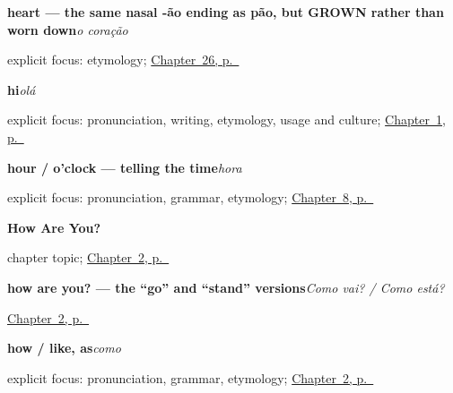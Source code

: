 \noindent\begin{minipage}[t]{\linewidth}
\raggedright
\textbf{heart — the same nasal -ão ending as pão, but GROWN rather than worn down}\enspace\emph{o coração}\par
\footnotesize explicit focus: etymology; \hyperref[ch:pt-body-how-are-you]{Chapter~26, p.~\pageref*{ch:pt-body-how-are-you}}
\end{minipage}\par\smallskip

\noindent\begin{minipage}[t]{\linewidth}
\raggedright
\textbf{hi}\enspace\emph{olá}\par
\footnotesize explicit focus: pronunciation, writing, etymology, usage and culture; \hyperref[ch:greetings]{Chapter~1, p.~\pageref*{ch:greetings}}
\end{minipage}\par\smallskip

\noindent\begin{minipage}[t]{\linewidth}
\raggedright
\textbf{hour / o'clock — telling the time}\enspace\emph{hora}\par
\footnotesize explicit focus: pronunciation, grammar, etymology; \hyperref[ch:pt-telling-time]{Chapter~8, p.~\pageref*{ch:pt-telling-time}}
\end{minipage}\par\smallskip

\noindent\begin{minipage}[t]{\linewidth}
\raggedright
\textbf{How Are You?}\par
\footnotesize chapter topic; \hyperref[ch:pt-how-are-you]{Chapter~2, p.~\pageref*{ch:pt-how-are-you}}
\end{minipage}\par\smallskip

\noindent\begin{minipage}[t]{\linewidth}
\raggedright
\textbf{how are you? — the “go” and “stand” versions}\enspace\emph{Como vai? / Como está?}\par
\footnotesize \hyperref[ch:pt-how-are-you]{Chapter~2, p.~\pageref*{ch:pt-how-are-you}}
\end{minipage}\par\smallskip

\noindent\begin{minipage}[t]{\linewidth}
\raggedright
\textbf{how / like, as}\enspace\emph{como}\par
\footnotesize explicit focus: pronunciation, grammar, etymology; \hyperref[ch:pt-how-are-you]{Chapter~2, p.~\pageref*{ch:pt-how-are-you}}
\end{minipage}\par\smallskip

